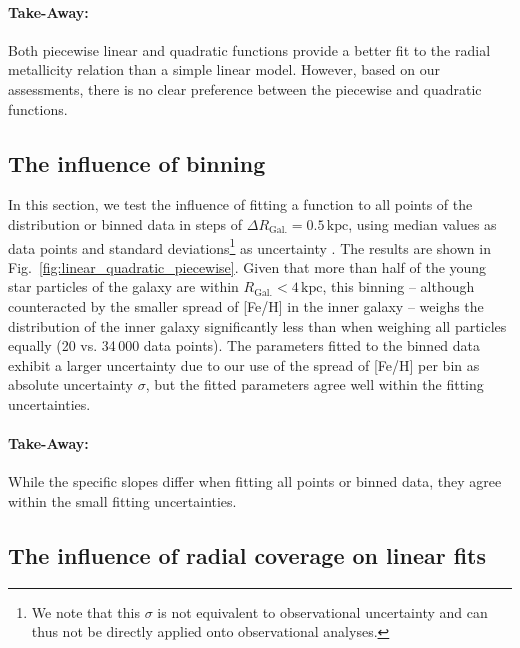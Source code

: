 \documentclass[twocolumn,apj,numberedappendix,appendixfloats,twocolappendix]{openjournal}
\begin{document}
\begin{CJK*}{UTF8}{gbsn}
\paragraph*{Take-Away:} Both piecewise linear and quadratic functions provide a better fit to the radial metallicity relation than a simple linear model. However, based on our assessments, there is no clear preference between the piecewise and quadratic functions.

\subsection{The influence of binning}
\label{sec:binning}

In this section, we test the influence of fitting a function to all points of the distribution or binned data in steps of $\Delta R_\mathrm{Gal.} = 0.5\,\mathrm{kpc}$, using median values as data points and standard deviations\footnote{We note that this $\sigma$ is not equivalent to observational uncertainty and can thus not be directly applied onto observational analyses.} as uncertainty \citep[see also][who fitted functions to radially binned IllustrisTNG data]{Hemler2021}. The results are shown in Fig.~\ref{fig:linear_quadratic_piecewise}. Given that more than half of the young star particles of the galaxy are within $R_\mathrm{Gal.} < 4\,\mathrm{kpc}$, this binning -- although counteracted by the smaller spread of [Fe/H] in the inner galaxy -- weighs the distribution of the inner galaxy significantly less than when weighing all particles equally (20 vs. 34\,000 data points). The parameters fitted to the binned data exhibit a larger uncertainty due to our use of the spread of [Fe/H] per bin as absolute uncertainty $\sigma$, but the fitted parameters agree well within the fitting uncertainties.

\paragraph*{Take-Away:} While the specific slopes differ when fitting all points or binned data, they agree within the small fitting uncertainties.

\subsection{The influence of radial coverage on linear fits}
\label{sec:radial_coverage}


\end{CJK*}
\end{document}
